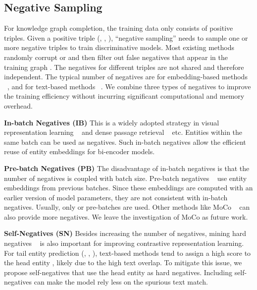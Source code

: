 \documentclass[11pt]{article}
\begin{document}
\subsection{Negative Sampling}

For knowledge graph completion,
the training data only consists of positive triples.
Given a positive triple (, , ),
``negative sampling'' needs to sample one or more negative triples
to train discriminative models.
Most existing methods randomly corrupt  or 
and then filter out false negatives that appear in the training graph .
The negatives for different triples are not shared and therefore independent.
The typical number of negatives are  for embedding-based methods ~\citep{sun2018rotate},
and  for text-based methods ~\citep{wang2021structure}.
We combine three types of negatives
to improve the training efficiency
without incurring significant computational and memory overhead.
\newline

\noindent
\textbf{In-batch Negatives (IB)}
This is a widely adopted strategy in visual representation learning ~\citep{chen2020simple}
and dense passage retrieval ~\citep{karpukhin-etal-2020-dense} etc.
Entities within the same batch can be used as negatives.
Such in-batch negatives allow the efficient reuse of entity embeddings for bi-encoder models.
\newline

\noindent
\textbf{Pre-batch Negatives (PB)}
The disadvantage of in-batch negatives is that
the number of negatives is coupled with batch size.
Pre-batch negatives ~\citep{Lee2021LearningDR}
use entity embeddings from previous batches.
Since these embeddings are computed with an earlier version of model parameters,
they are not consistent with in-batch negatives.
Usually,
only  or  pre-batches are used.
Other methods like MoCo ~\citep{he2020momentum} can also provide more negatives.
We leave the investigation of MoCo as future work.
\newline

\noindent
\textbf{Self-Negatives (SN)}
Besides increasing the number of negatives,
mining hard negatives ~\citep{gao2021simcse,xiong2020approximate} is also important
for improving contrastive representation learning.
For tail entity prediction (, , ),
text-based methods
tend to assign a high score to the head entity ,
likely due to the high text overlap.
To mitigate this issue,
we propose self-negatives that use the head entity  as hard negatives.
Including self-negatives can make the model rely less
on the spurious text match.
\newline
\end{document}
